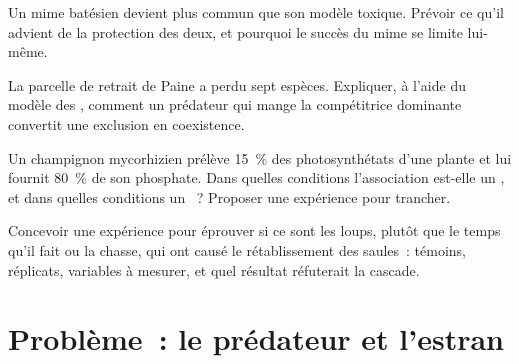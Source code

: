 \begin{exercise}[$\star\star$]\label{exo:b1:species-interactions:9}
Un mime batésien devient plus commun que son modèle toxique. Prévoir ce
qu'il advient de la protection des deux, et pourquoi le succès du mime
se limite lui-même.
\end{exercise}

\begin{exercise}[$\star\star\star$]\label{exo:b1:species-interactions:10}
La parcelle de retrait de Paine a perdu sept espèces. Expliquer, à
l'aide du modèle des , comment un prédateur qui mange la
compétitrice dominante convertit une exclusion en coexistence.
\end{exercise}

\begin{exercise}[$\star\star\star$]\label{exo:b1:species-interactions:11}
Un champignon mycorhizien prélève \qty{15}{\%} des photosynthétats
d'une plante et lui fournit \qty{80}{\%} de son phosphate. Dans quelles
conditions l'association est-elle un , et dans quelles
conditions un ~? Proposer une expérience pour trancher.
\end{exercise}

\begin{exercise}[$\star\star\star$]\label{exo:b1:species-interactions:12}
Concevoir une expérience pour éprouver si ce sont les loups, plutôt que
le temps qu'il fait ou la chasse, qui ont causé le rétablissement des
saules~: témoins, réplicats, variables à mesurer, et quel résultat
réfuterait la cascade.
\end{exercise}

\section{Problème~: le prédateur et l'estran}


